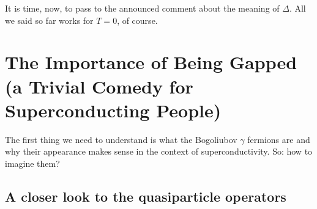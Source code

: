 It is time, now, to pass to the announced comment about the meaning of $\Delta$. All we said so far works for $T=0$, of course.

\section[The Importance of Being Gapped]{The Importance of Being Gapped \newline \small (a Trivial Comedy for Superconducting People)}

The first thing we need to understand is what the Bogoliubov $\gamma$ fermions are and why their appearance makes sense in the context of superconductivity. So: how to imagine them?

\subsection{A closer look to the quasiparticle operators}

